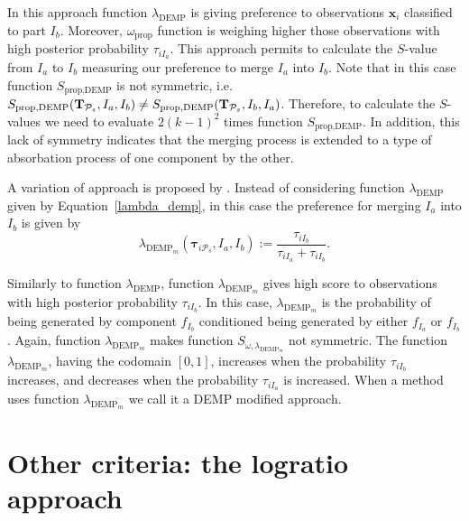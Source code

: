 \documentclass[submit]{smj}
\theoremstyle{definition}
\newcommand{\m}[1]{\boldsymbol{#1}}
\begin{document}
In this approach function $\lambda_{\text{DEMP}}$ is giving preference to observations $\m x_i$ classified to part $I_b$. Moreover, $\omega_{\text{prop}}$ function is weighing higher those observations with high posterior probability $\tau_{iI_a}$. This approach permits to calculate the $S$-value from $I_a$ to $I_b$ measuring our preference to merge $I_a$ into $I_b$. Note that in this case function  $S_{\text{prop}, \text{DEMP}}$ is not symmetric, i.e. $S_{\text{prop}, \text{DEMP}}(\text{\textbf{T}}_{\mathcal{P}_s},  I_a,  I_b) \neq S_{\text{prop}, \text{DEMP}}(\text{\textbf{T}}_{\mathcal{P}_s},  I_b,  I_a)$. Therefore, to calculate the $S$-values we need to evaluate $2 (k-1)^2$ times function $S_{\text{prop}, \text{DEMP}}$. In addition, this lack of symmetry indicates that the merging process is extended to a type of absorbation process of one component by the other.

A variation of \cite{hennig2010methods} approach is proposed by \cite{longford2014}. Instead of considering function $\lambda_{\text{DEMP}}$ given by Equation~\ref{lambda_demp}, in this case the preference for merging $I_a$ into $I_b$ is given by
\begin{equation}\label{lambda_dempM}
\lambda_{\text{DEMP}_m}(\m\tau_{i \mathcal{P}_s},  I_a,  I_b) := \frac{\tau_{iI_b}}{\tau_{iI_a} + \tau_{iI_b}}.
\end{equation} 


Similarly to function $\lambda_{\text{DEMP}}$, function $\lambda_{\text{DEMP}_m}$ gives high score to observations with high posterior probability $\tau_{iI_b}$. In this case, $\lambda_{\text{DEMP}_m}$ is the probability of being generated by component $f_{I_b}$ conditioned being generated by either $f_{I_a}$ or $f_{I_b}$. Again, function $\lambda_{\text{DEMP}_m}$ makes function $S_{\omega, \lambda_{\text{DEMP}_m}}$ not symmetric. The function $\lambda_{\text{DEMP}_m}$, having the codomain $[0,1]$, increases when the probability $\tau_{iI_b}$ increases, and decreases when the probability $\tau_{iI_a}$ is increased. When a method uses function $\lambda_{\text{DEMP}_m}$ we call it a DEMP modified approach.


\section{Other criteria: the logratio approach}\label{logratio_section}
\end{document}
